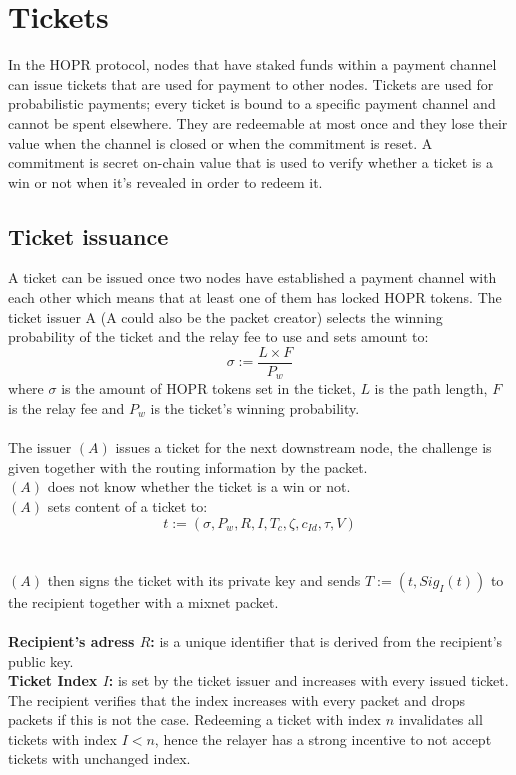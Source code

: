 \section{Tickets}
In the HOPR protocol, nodes that have staked funds within a payment channel can issue tickets that are used for payment to other nodes.
Tickets are used for probabilistic payments; every ticket is bound to a specific payment channel and cannot be spent elsewhere.
They are redeemable at most once and they lose their value when the channel is closed or when the commitment is reset. A commitment is secret on-chain value that is used to verify whether a ticket is a win or not when it's revealed in order to redeem it.
\subsection{Ticket issuance}
A ticket can be issued once two nodes have established a payment channel with each other which means that at least one of them has locked HOPR tokens.
\newline The ticket issuer A (A could also be the packet creator) selects the winning probability of the ticket and the relay fee to use and sets amount to:
$$\sigma:=\dfrac{L\times F}{P_w}$$
where $\sigma$ is the amount of HOPR tokens set in the ticket, $L$ is the path length, $F$ is the relay fee and $P_w$ is the ticket's winning probability.
\\~\\The issuer $(A)$ issues a ticket for the next downstream node,
the challenge is given together with the routing information by the packet.
\\$(A)$ does not know whether the ticket is a win or not.
    \\$(A)$ sets content of a ticket to: $$t:=(\sigma,P_w,R,I,T_c,\zeta,c_{Id},\tau,V)$$
\\~\\$(A)$ then signs the ticket with its private key and sends $T:= (t, Sig_I(t))$ to the recipient together with a mixnet packet.
    \\~\\\textbf{Recipient's adress $R$:} is a unique identifier that is derived from the recipient's public key.
    \\\textbf{Ticket Index $I$:} is set by the ticket issuer and increases with every issued ticket. The recipient verifies that the index increases with every packet and drops packets if this is not the case. Redeeming a ticket with index $n$ invalidates all tickets with index $I<n$, hence the relayer has a strong incentive to not accept tickets with unchanged index.
